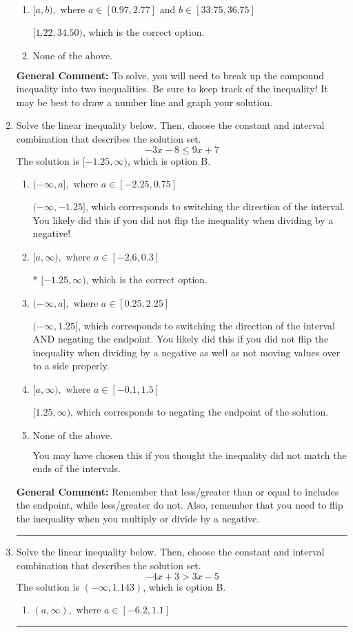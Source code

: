 \documentclass{extbook}[14pt]
\newcommand{\litem}[1]{\item #1

\rule{\textwidth}{0.4pt}}
\begin{document}
\begin{enumerate}
{\begin{enumerate}[label=\Alph*.]
$(1.22, 34.50]$, which corresponds to flipping the inequality.
\item \( [a, b), \text{ where } a \in [0.97, 2.77] \text{ and } b \in [33.75, 36.75] \)

$[1.22, 34.50)$, which is the correct option.
\item \( \text{None of the above.} \)


\end{enumerate}

\textbf{General Comment:} To solve, you will need to break up the compound inequality into two inequalities. Be sure to keep track of the inequality! It may be best to draw a number line and graph your solution.
}
\litem{
Solve the linear inequality below. Then, choose the constant and interval combination that describes the solution set.
\[ -3x -8 \leq 9x + 7 \]The solution is \( [-1.25, \infty) \), which is option B.\begin{enumerate}[label=\Alph*.]
\item \( (-\infty, a], \text{ where } a \in [-2.25, 0.75] \)

 $(-\infty, -1.25]$, which corresponds to switching the direction of the interval. You likely did this if you did not flip the inequality when dividing by a negative!
\item \( [a, \infty), \text{ where } a \in [-2.6, 0.3] \)

* $[-1.25, \infty)$, which is the correct option.
\item \( (-\infty, a], \text{ where } a \in [0.25, 2.25] \)

 $(-\infty, 1.25]$, which corresponds to switching the direction of the interval AND negating the endpoint. You likely did this if you did not flip the inequality when dividing by a negative as well as not moving values over to a side properly.
\item \( [a, \infty), \text{ where } a \in [-0.1, 1.5] \)

 $[1.25, \infty)$, which corresponds to negating the endpoint of the solution.
\item \( \text{None of the above}. \)

You may have chosen this if you thought the inequality did not match the ends of the intervals.
\end{enumerate}

\textbf{General Comment:} Remember that less/greater than or equal to includes the endpoint, while less/greater do not. Also, remember that you need to flip the inequality when you multiply or divide by a negative.
}
\litem{
Solve the linear inequality below. Then, choose the constant and interval combination that describes the solution set.
\[ -4x + 3 > 3x -5 \]The solution is \( (-\infty, 1.143) \), which is option B.\begin{enumerate}[label=\Alph*.]
\item \( (a, \infty), \text{ where } a \in [-6.2, 1.1] \)


\end{enumerate}}
\end{enumerate}
\end{document}
